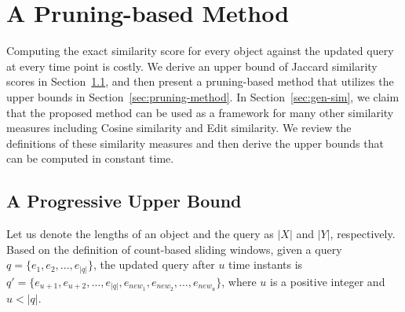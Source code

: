 
%
%

\chapter{A Pruning-based Method}
\label{ch:pruning}


Computing the exact similarity score for every object against the updated query at every time point is costly.  We derive an upper bound of Jaccard similarity scores in Section~\ref{sec:jac-bound}, and then present a pruning-based method that utilizes the upper bounds in Section~\ref{sec:pruning-method}. In Section~\ref{sec:gen-sim}, we claim that the proposed method can be used as a framework for many other similarity measures including Cosine similarity and Edit similarity. We review the definitions of these similarity measures and then derive the upper bounds that can be computed in constant time. 

\section{A Progressive Upper Bound}
\label{sec:jac-bound}
Let us denote the lengths of an object and the query as $|X|$ and $|Y|$, respectively. Based on the definition of count-based sliding windows, %
%
%
given a query $q=\{e_1, e_2,..., e_{|q|}\}$, the updated query after $u$ time instants is $q'=\{e_{u+1}, e_{u+2}, ..., e_{|q|}, e_{new_1}, e_{new_2}, ..., e_{new_u}\}$, where $u$ is a positive integer and $u<|q|$.

